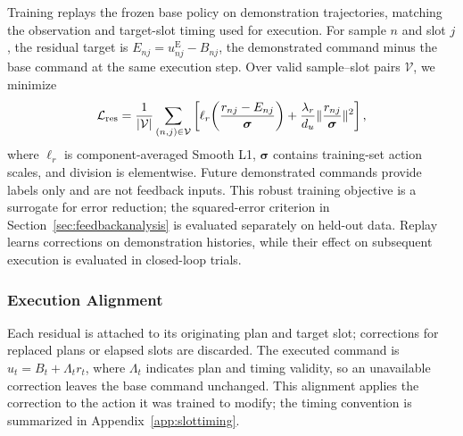 Training replays the frozen base policy on demonstration trajectories, matching the observation and target-slot timing used for execution.
For sample $n$ and slot $j$, the residual target is $E_{nj}=u_{nj}^{\mathrm E}-B_{nj}$, the demonstrated command minus the base command at the same execution step.
Over valid sample--slot pairs $\mathcal V$, we minimize
\begin{equation}
 \mathcal L_{\mathrm{res}}
 =\frac{1}{|\mathcal V|}\sum_{(n,j)\in\mathcal V}
 \left[
 \ell_r\!\left(\frac{r_{nj}-E_{nj}}{\bm\sigma}\right)
 +\frac{\lambda_r}{d_u}
       \lVert\frac{r_{nj}}{\bm\sigma}\rVert^2
 \right],
 \label{eq:methodresloss}
\end{equation}
where $\ell_r$ is component-averaged Smooth L1, $\bm\sigma$ contains training-set action scales, and division is elementwise.
Future demonstrated commands provide labels only and are not feedback inputs.
This robust training objective is a surrogate for error reduction; the squared-error criterion in Section~\ref{sec:feedbackanalysis} is evaluated separately on held-out data.
Replay learns corrections on demonstration histories, while their effect on subsequent execution is evaluated in closed-loop trials.

\subsubsection{Execution Alignment}
Each residual is attached to its originating plan and target slot; corrections for replaced plans or elapsed slots are discarded.
The executed command is
$u_t=B_t+\Lambda_t r_t$,
where $\Lambda_t$ indicates plan and timing validity, so an unavailable correction leaves the base command unchanged.
This alignment applies the correction to the action it was trained to modify; the timing convention is summarized in Appendix~\ref{app:slottiming}.

